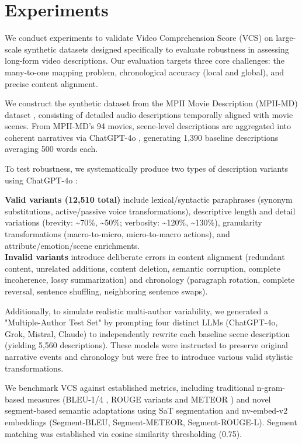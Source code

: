 \section{Experiments}
We conduct experiments to validate Video Comprehension Score (VCS) on large-scale synthetic datasets designed specifically to evaluate robustness in assessing long-form video descriptions. Our evaluation targets three core challenges: the many-to-one mapping problem, chronological accuracy (local and global), and precise content alignment.

We construct the synthetic dataset from the MPII Movie Description (MPII-MD) dataset \cite{rohrbach2015dataset}, consisting of detailed audio descriptions temporally aligned with movie scenes. From MPII-MD's 94 movies, scene-level descriptions are aggregated into coherent narratives via ChatGPT-4o \cite{achiam2023gpt}, generating 1,390 baseline descriptions averaging 500 words each.

To test robustness, we systematically produce two types of description variants using ChatGPT-4o \cite{achiam2023gpt}:

\textbf{Valid variants (12,510 total)} include lexical/syntactic paraphrases (synonym substitutions, active/passive voice transformations), descriptive length and detail variations (brevity: \textasciitilde70\%, \textasciitilde50\%; verbosity: \textasciitilde120\%, \textasciitilde130\%), granularity transformations (macro-to-micro, micro-to-macro actions), and attribute/emotion/scene enrichments.\\
\textbf{Invalid variants} introduce deliberate errors in content alignment (redundant content, unrelated additions, content deletion, semantic corruption, complete incoherence, lossy summarization) and chronology (paragraph rotation, complete reversal, sentence shuffling, neighboring sentence swaps).


Additionally, to simulate realistic multi-author variability, we generated a "Multiple-Author Test Set" by prompting four distinct LLMs (ChatGPT-4o, Grok, Mistral, Claude) to independently rewrite each baseline scene description (yielding 5,560 descriptions). These models were instructed to preserve original narrative events and chronology but were free to introduce various valid stylistic transformations.

We benchmark VCS against established metrics, including traditional n-gram-based measures (BLEU-1/4 \cite{papineni2002bleu}, ROUGE \cite{lin2004rouge} variants and METEOR \cite{banerjee2005meteor}) and novel segment-based semantic adaptations using SaT segmentation \cite{frohmann2024segment} and nv-embed-v2 \cite{lee2024nv} embeddings (Segment-BLEU, Segment-METEOR, Segment-ROUGE-L). Segment matching was established via cosine similarity thresholding (0.75).

